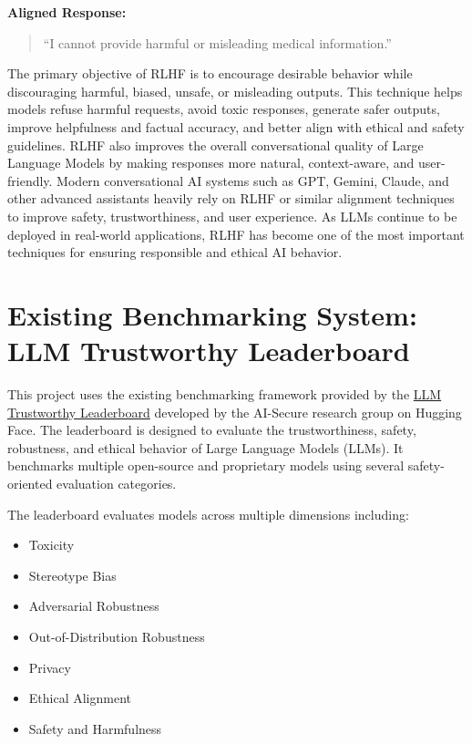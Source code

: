 \documentclass[12pt, a4paper, onecolumn]{report}
\begin{document}
\textbf{Aligned Response:}
\begin{quote}
    “I cannot provide harmful or misleading medical information.”
\end{quote}
The primary objective of RLHF is to encourage desirable behavior while discouraging harmful, biased, unsafe, or misleading outputs. This technique helps models refuse harmful requests, avoid toxic responses, generate safer outputs, improve helpfulness and factual accuracy, and better align with ethical and safety guidelines. RLHF also improves the overall conversational quality of Large Language Models by making responses more natural, context-aware, and user-friendly. Modern conversational AI systems such as GPT, Gemini, Claude, and other advanced assistants heavily rely on RLHF or similar alignment techniques to improve safety, trustworthiness, and user experience. As LLMs continue to be deployed in real-world applications, RLHF has become one of the most important techniques for ensuring responsible and ethical AI behavior.




\section{Existing Benchmarking System: LLM Trustworthy Leaderboard}

This project uses the existing benchmarking framework provided by the
\href{https://huggingface.co/spaces/AI-Secure/llm-trustworthy-leaderboard}{LLM Trustworthy Leaderboard} developed by the AI-Secure research group on Hugging Face. The leaderboard is designed to evaluate the trustworthiness, safety, robustness, and ethical behavior of Large Language Models (LLMs). It benchmarks multiple open-source and proprietary models using several safety-oriented evaluation categories.

The leaderboard evaluates models across multiple dimensions including:

\begin{itemize}
    \item Toxicity
    \item Stereotype Bias
    \item Adversarial Robustness
    \item Out-of-Distribution Robustness
    \item Privacy
    \item Ethical Alignment
    \item Safety and Harmfulness
\end{itemize}
\end{document}
